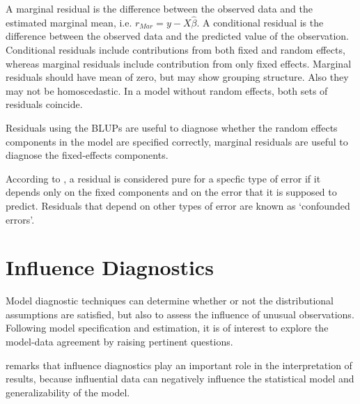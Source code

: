 \documentclass[12pt, a4paper]{report}
\theoremstyle{definition}
\theoremstyle{remark}
\begin{document}
A marginal residual is the difference between the observed data and the estimated marginal mean, i.e. $r_{Mar} = y - X \hat{\beta}$. A conditional residual is the difference between the observed data and the predicted value of the observation. 
Conditional residuals include contributions from both fixed and random effects, whereas marginal residuals include contribution from only fixed effects. Marginal residuals should have mean of zero, but may show grouping structure. Also they may not be homoscedastic. In a model without random effects, both sets of residuals coincide.



Residuals using the BLUPs are useful to diagnose whether the random effects components in the model are specified correctly, marginal residuals are useful to diagnose the fixed-effects components.


According to \citet{hilden1995}, a residual is considered pure for a specfic type of error if it depends only on the fixed components and on the error that it is supposed to predict. Residuals that depend on other types of error are known as `confounded errors'.





%
%



\section{Influence Diagnostics}
Model diagnostic techniques can determine whether or not the distributional assumptions are satisfied, but also to assess the influence of unusual observations. Following model specification and estimation, it is of interest to explore the model-data agreement by raising pertinent questions. 

\citet{west} remarks that influence diagnostics play an important role in the interpretation of results, because influential data can negatively influence the statistical model and generalizability of the model. 
\end{document}
